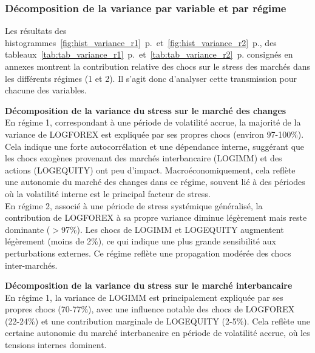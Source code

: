 \subsubsection{Décomposition de la variance par variable et par régime}

Les résultats des histogrammes~\autoref{fig:hist_variance_r1}~p.\pageref{fig:hist_variance_r1}~et~\autoref{fig:hist_variance_r2}~p.\pageref{fig:hist_variance_r2}, des tableaux~\autoref{tab:tab_variance_r1}~p.\pageref{tab:tab_variance_r1}~et~\autoref{tab:tab_variance_r2}~p.\pageref{tab:tab_variance_r2} consignés en annexes montrent la contribution relative des chocs sur le stress des marchés dans les différents régimes (1 et 2). Il s'agit donc d'analyser cette transmission pour chacune des variables.

\vspace{0.5cm}

\textbf{Décomposition de la variance du stress sur le marché des changes} \\

En régime 1, correspondant à une période de volatilité accrue, la majorité de la variance de LOGFOREX est expliquée par ses propres chocs (environ 97-100\%). Cela indique une forte autocorrélation et une dépendance interne, suggérant que les chocs exogènes provenant des marchés interbancaire (LOGIMM) et des actions (LOGEQUITY) ont peu d’impact. Macroéconomiquement, cela reflète une autonomie du marché des changes dans ce régime, souvent lié à des périodes où la volatilité interne est le principal facteur de stress.\\

En régime 2, associé à une période de stress systémique généralisé, la contribution de LOGFOREX à sa propre variance diminue légèrement mais reste dominante ($>$97\%). Les chocs de LOGIMM et LOGEQUITY augmentent légèrement (moins de 2\%), ce qui indique une plus grande sensibilité aux perturbations externes. Ce régime reflète une propagation modérée des chocs inter-marchés.

\vspace{0.5cm}

\textbf{Décomposition de la variance du stress sur le marché interbancaire} \\

En régime 1, la variance de LOGIMM est principalement expliquée par ses propres chocs (70-77\%), avec une influence notable des chocs de LOGFOREX (22-24\%) et une contribution marginale de LOGEQUITY (2-5\%). Cela reflète une certaine autonomie du marché interbancaire en période de volatilité accrue, où les tensions internes dominent.\\

